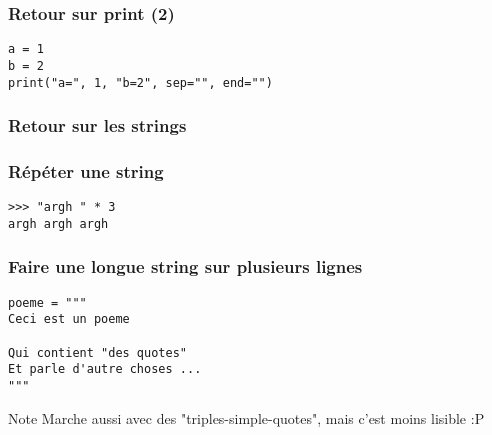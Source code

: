 \documentclass{beamer}
\begin{document}
\begin{frame}[fragile]
  \frametitle{Retour sur print (2)}

\begin{lstlisting}
a = 1
b = 2
print("a=", 1, "b=2", sep="", end="")
\end{lstlisting}

\end{frame}

\begin{frame}[fragile]
  \frametitle{Retour sur les strings}
\end{frame}

\begin{frame}[fragile]
  \frametitle{Répéter une string}

\begin{lstlisting}
>>> "argh " * 3
argh argh argh
\end{lstlisting}

\end{frame}


\begin{frame}[fragile]
  \frametitle{Faire une longue string sur plusieurs lignes}

\begin{lstlisting}
poeme = """
Ceci est un poeme

Qui contient "des quotes"
Et parle d'autre choses ...
"""
\end{lstlisting}

\begin{block}{Note}
Marche aussi avec des "triples-simple-quotes", mais c'est moins lisible :P
\end{block}
\end{frame}













\end{document}

